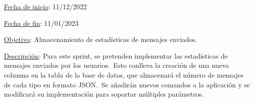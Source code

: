 
\underline{Fecha de inicio}: 11/12/2022

\underline{Fecha de fin}: 11/01/2023

\underline{Objetivo}:
Almacenamiento de estadísticas de mensajes enviados.

\underline{Descripción}:
Para este sprint, se pretenden implementar las estadísticas de mensajes enviados por los usuarios.\ Esto conlleva la
creación de una nueva columna en la tabla  de la base de datos, que almacenará el número de mensajes
de cada tipo en formato JSON\@.\ Se añadirán nuevos comandos a la aplicación y se modificará su implementación
para soportar múltiples parámetros.


